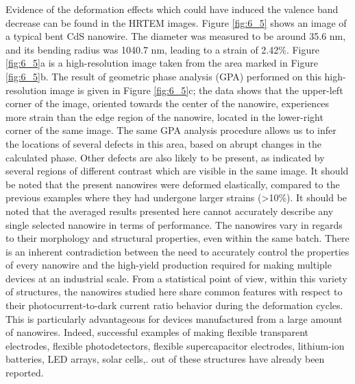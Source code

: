 Evidence of the deformation effects which could have induced the valence band decrease can be found in the HRTEM images. Figure \ref{fig:6_5} shows an image of a typical bent CdS nanowire. The diameter was measured to be around 35.6 nm, and its bending radius was 1040.7 nm, leading to a strain of 2.42\%.  Figure \ref{fig:6_5}a is a high-resolution image taken from the area marked in Figure \ref{fig:6_5}b. The result of geometric phase analysis (GPA) performed on this high-resolution image is given in Figure \ref{fig:6_5}c; the data shows that the upper-left corner of the image, oriented towards the center of the nanowire, experiences more strain than the edge region of the nanowire, located in the lower-right corner of the same image. The same GPA analysis procedure allows us to infer the locations of several defects in this area, based on abrupt changes in the calculated phase. Other defects are also likely to be present, as indicated by several regions of different contrast which are visible in the same image. It should be noted that the present nanowires were deformed elastically, compared to the previous examples where they had undergone larger strains (>10\%).\cite{Wang2013}
It should be noted that the averaged results presented here cannot accurately describe any single selected nanowire in terms of performance. The nanowires vary in regards to their morphology and structural properties, even within the same batch. There is an inherent contradiction between the need to accurately control the properties of every nanowire and the high-yield production required for making multiple devices at an industrial scale. From a statistical point of view, within this variety of structures, the nanowires studied here share common features with respect to their photocurrent-to-dark current ratio behavior during the deformation cycles. This is particularly advantageous for devices manufactured from a large amount of nanowires. Indeed, successful examples of making flexible transparent electrodes,\cite{Liu2014a} flexible photodetectors,\cite{Xu2015b} flexible supercapacitor electrodes,\cite{Liu2014a} lithium-ion batteries,\cite{Wang2015} LED arrays,\cite{Wang2015a} solar cells,\cite{Zhang2012}. out of these structures have already been reported.\\

